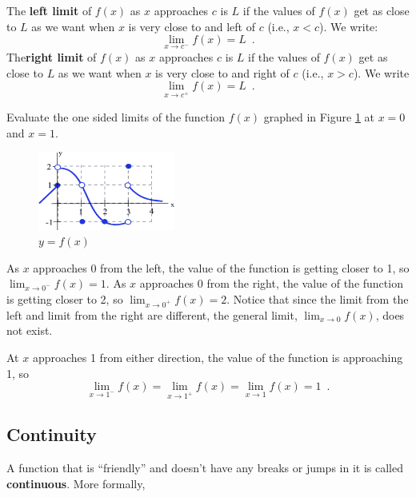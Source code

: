 The {\bf left limit} of $f(x)$ as $x$ approaches $c$ is $L$ if the values of $f(x)$ get as close to $L$ as we want when $x$ is very close to and left of $c$ (i.e., $x<c$). We write:
$$\lim_{x\to c^-}f(x)=L \enspace .$$
The{\bf right limit} of $f(x)$ as $x$ approaches $c$ is $L$ if the values of $f(x)$ get as close to $L$ as we want when $x$ is very close to and right of $c$ (i.e., $x>c$). We write
$$\lim_{x\to c^+}f(x)=L \enspace .$$
\begin{example}
Evaluate the one sided limits of the function $f(x)$ graphed in Figure \ref{fig:2-4-fx-ex} at $x=0$ and $x=1$.

\begin{figure}[!ht]
  \centering
    \includegraphics[width=0.4\textwidth]{img/chap2/image014.png}
    \caption{$y=f(x)$}
    \label{fig:2-4-fx-ex}
\end{figure}

\begin{solution} As $x$ approaches 0 from the left, the value of the function is getting closer to 1, so $\displaystyle\lim_{x\to 0^-}f(x)=1$.
As $x$ approaches 0 from the right, the value of the function is getting closer to 2, so $\displaystyle\lim_{x\to 0^+}f(x)=2$.
Notice that since the limit from the left and limit from the right are different, the general limit, $\displaystyle\lim_{x\to 0}f(x)$, does not exist.

At $x$ approaches 1 from either direction, the value of the function is approaching 1, so
$$\lim_{x\to 1^-}f(x)=\lim_{x\to 1^+}f(x)=\lim_{x\to 1}f(x)=1 \enspace.$$
\end{solution}\end{example}

\subsection{Continuity}
\label{ssec:continuity}
A function that is ``friendly'' and doesn't have any breaks or jumps in it is called {\bf continuous}. More formally,

